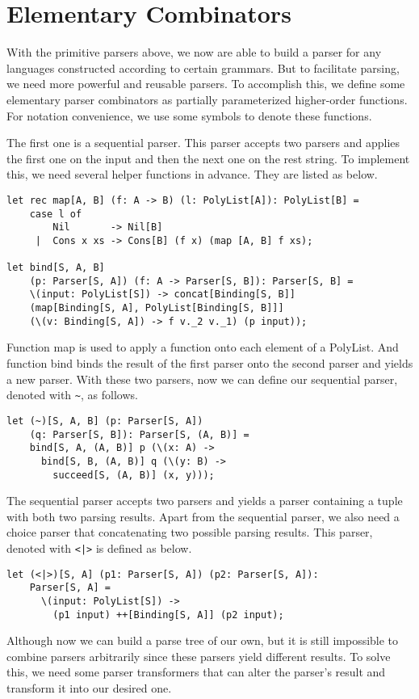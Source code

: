 \section{Elementary Combinators}
With the primitive parsers above, we now are able to build a parser for any languages constructed according to certain grammars. But to facilitate parsing, we need more powerful and reusable parsers. To accomplish this, we define some elementary parser combinators as partially parameterized higher-order functions. For notation convenience, we use some symbols to denote these functions.

The first one is a sequential parser. This parser accepts two parsers and applies the first one on the input and then the next one on the rest string. To implement this, we need several helper functions in advance. They are listed as below.
\begin{lstlisting}
let rec map[A, B] (f: A -> B) (l: PolyList[A]): PolyList[B] =
    case l of
        Nil       -> Nil[B]
     |  Cons x xs -> Cons[B] (f x) (map [A, B] f xs);

let bind[S, A, B]
    (p: Parser[S, A]) (f: A -> Parser[S, B]): Parser[S, B] =
    \(input: PolyList[S]) -> concat[Binding[S, B]]
    (map[Binding[S, A], PolyList[Binding[S, B]]]
    (\(v: Binding[S, A]) -> f v._2 v._1) (p input));
\end{lstlisting}
Function map is used to apply a function onto each element of a PolyList. And function bind binds the result of the first parser onto the second parser and yields a new parser. With these two parsers, now we can define our sequential parser, denoted with \texttt{\textasciitilde}, as follows.
\begin{lstlisting}
let (~)[S, A, B] (p: Parser[S, A])
    (q: Parser[S, B]): Parser[S, (A, B)] =
	bind[S, A, (A, B)] p (\(x: A) ->
	  bind[S, B, (A, B)] q (\(y: B) ->
	    succeed[S, (A, B)] (x, y)));
\end{lstlisting}
The sequential parser accepts two parsers and yields a parser containing a tuple with both two parsing results. Apart from the sequential parser, we also need a choice parser that concatenating two possible parsing results. This parser, denoted with \texttt{<|>} is defined as below.
\begin{lstlisting}
let (<|>)[S, A] (p1: Parser[S, A]) (p2: Parser[S, A]):
    Parser[S, A] =
	  \(input: PolyList[S]) ->
	    (p1 input) ++[Binding[S, A]] (p2 input);
\end{lstlisting}
Although now we can build a parse tree of our own, but it is still impossible to combine parsers arbitrarily since these parsers yield different results. To solve this, we need some parser transformers that can alter the parser's result and transform it into our desired one.

